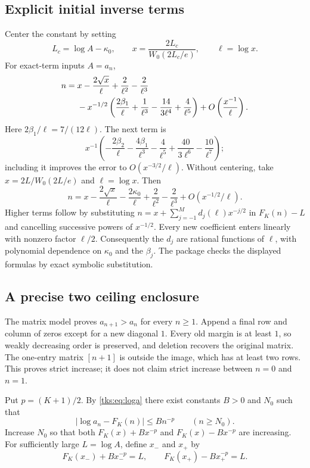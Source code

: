 \subsection{Explicit initial inverse terms}
Center the constant by setting
\[
L_c=\log A-\kappa_0,\qquad
x=\frac{2L_c}{W_0(2L_c/e)},\qquad\ell=\log x.
\]
For exact-term inputs $A=a_n$,
\begin{align}
n={}&x-\frac{2\sqrt x}{\ell}+\frac2{\ell^2}-\frac2{\ell^3}\notag\\
 &-x^{-1/2}\left(\frac{2\beta_1}{\ell}
       +\frac1{\ell^3}-\frac{14}{3\ell^4}+\frac4{\ell^5}\right)
       +O\left(\frac{x^{-1}}{\ell}\right).\label{tks:eq:centeredinverse}
\end{align}
Here $2\beta_1/\ell=7/(12\ell)$. The next term is
\begin{equation}\label{tks:eq:centerednext}
x^{-1}\left(-\frac{2\beta_2}{\ell}-\frac{4\beta_1}{\ell^3}
       -\frac4{\ell^5}+\frac{40}{3\ell^6}-\frac{10}{\ell^7}\right);
\end{equation}
including it improves the error to $O(x^{-3/2}/\ell)$.
Without centering, take $x=2L/W_0(2L/e)$ and $\ell=\log x$. Then
\begin{equation}\label{tks:eq:uncenteredinverse}
n=x-\frac{2\sqrt x}{\ell}-\frac{2\kappa_0}{\ell}
        +\frac2{\ell^2}-\frac2{\ell^3}
        +O(x^{-1/2}/\ell).
\end{equation}
Higher terms follow by substituting
$n=x+\sum_{j=-1}^{M}d_j(\ell)x^{-j/2}$ in $F_K(n)-L$ and cancelling successive powers of $x^{-1/2}$. Every new coefficient enters linearly with nonzero factor $\ell/2$. Consequently the $d_j$ are rational functions of $\ell$, with polynomial dependence on $\kappa_0$ and the $\beta_j$. The package checks the displayed formulas by exact symbolic substitution.

\subsection{A precise two ceiling enclosure}
The matrix model proves $a_{n+1}>a_n$ for every $n\geq1$. Append a final row and column of zeros except for a new diagonal $1$. Every old margin is at least $1$, so weakly decreasing order is preserved, and deletion recovers the original matrix. The one-entry matrix $[n+1]$ is outside the image, which has at least two rows. This proves strict increase; it does not claim strict increase between $n=0$ and $n=1$.

Put $p=(K+1)/2$. By \eqref{tks:eq:loga} there exist constants $B>0$ and $N_0$ such that
\begin{equation}\label{tks:eq:logerrorbound}
|\log a_n-F_K(n)|\leq Bn^{-p}\qquad(n\geq N_0).
\end{equation}
Increase $N_0$ so that both $F_K(x)+Bx^{-p}$ and $F_K(x)-Bx^{-p}$ are increasing. For sufficiently large $L=\log A$, define $x_-$ and $x_+$ by
\begin{equation}\label{tks:eq:enveloperoots}
F_K(x_-)+Bx_-^{-p}=L,\qquad
F_K(x_+)-Bx_+^{-p}=L.
\end{equation}

